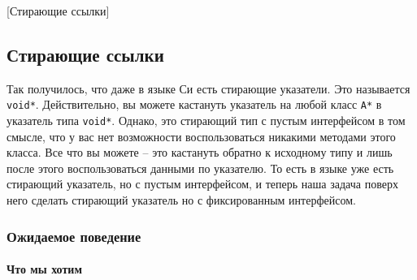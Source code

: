 [Стирающие ссылки]


\subsection{Стирающие ссылки}
\label{section::RefErasure}

Так получилось, что даже в языке Си есть стирающие указатели.
Это называется \texttt{void*}.
Действительно, вы можете кастануть указатель на любой класс \texttt{A*} в указатель типа \texttt{void*}.
Однако, это стирающий тип с пустым интерфейсом в том смысле, что у вас нет возможности воспользоваться никакими методами этого класса.
Все что вы можете -- это кастануть обратно к исходному типу и лишь после этого воспользоваться данными по указателю.
То есть в языке уже есть стирающий указатель, но с пустым интерфейсом, и теперь наша задача поверх него сделать стирающий указатель но с фиксированным интерфейсом.

\subsubsection{Ожидаемое поведение}

\paragraph{Что мы хотим}

